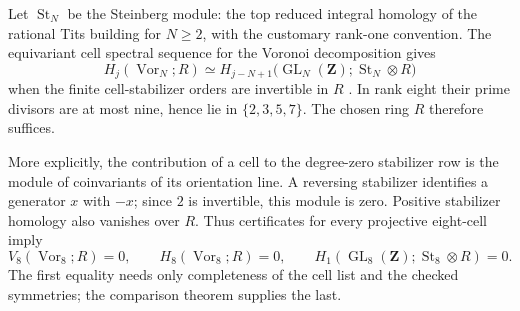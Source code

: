 \documentclass[11pt,a4paper]{article}
\numberwithin{equation}{section}
\theoremstyle{definition}
\theoremstyle{remark}
\newcommand{\Z}{\mathbf Z}
\newcommand{\GL}{\operatorname{GL}}
\newcommand{\St}{\operatorname{St}}
\newcommand{\Vor}{\operatorname{Vor}}
\begin{document}
Let \(\St_N\) be the Steinberg module: the top reduced integral homology
of the rational Tits building for \(N\geq2\), with the customary
rank-one convention. The equivariant cell spectral sequence for the
Voronoi decomposition gives
\begin{equation}\label{eq:comparison}
 H_j(\Vor_N;R)\simeq
 H_{j-N+1}\bigl(\GL_N(\Z);\St_N\otimes R\bigr)
\end{equation}
when the finite cell-stabilizer orders are invertible in \(R\)
\cite[Proposition~1.5]{DEKM}. In rank eight their prime divisors
are at most nine, hence lie in \(\{2,3,5,7\}\).
The chosen ring \(R\) therefore suffices.

More explicitly, the contribution of a cell to the degree-zero
stabilizer row is the module of coinvariants of its orientation line.
A reversing stabilizer identifies a generator \(x\) with \(-x\);
since \(2\) is invertible, this module is zero.
Positive stabilizer homology also vanishes over \(R\).
Thus certificates for every projective eight-cell imply
\begin{equation}\label{eq:rank8}
 V_8(\Vor_8;R)=0,\qquad
 H_8(\Vor_8;R)=0,\qquad
 H_1(\GL_8(\Z);\St_8\otimes R)=0.
\end{equation}
The first equality needs only completeness of the cell list and
the checked symmetries; the comparison theorem supplies the last.
\end{document}
